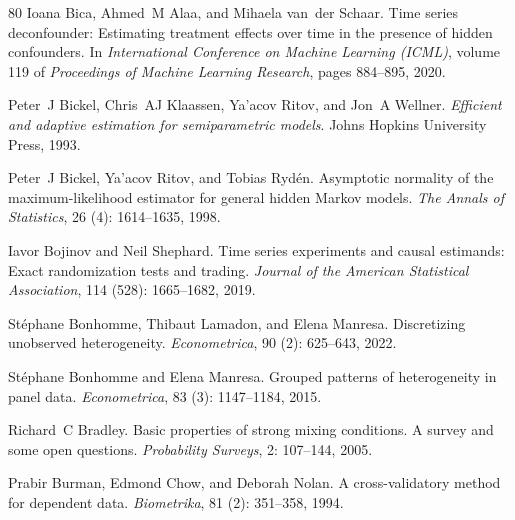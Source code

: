 \begin{thebibliography}{80}
Ioana Bica, Ahmed~M Alaa, and Mihaela van~der Schaar.
\newblock Time series deconfounder: Estimating treatment effects over time in the presence of hidden confounders.
\newblock In \emph{International Conference on Machine Learning (ICML)}, volume 119 of \emph{Proceedings of Machine Learning Research}, pages 884--895, 2020.

Peter~J Bickel, Chris~AJ Klaassen, Ya'acov Ritov, and Jon~A Wellner.
\newblock \emph{Efficient and adaptive estimation for semiparametric models}.
\newblock Johns Hopkins University Press, 1993.

Peter~J Bickel, Ya'acov Ritov, and Tobias Ryd{\'e}n.
\newblock Asymptotic normality of the maximum-likelihood estimator for general hidden {M}arkov models.
\newblock \emph{The Annals of Statistics}, 26 (4): 1614--1635, 1998.

Iavor Bojinov and Neil Shephard.
\newblock Time series experiments and causal estimands: Exact randomization tests and trading.
\newblock \emph{Journal of the American Statistical Association}, 114 (528): 1665--1682, 2019.

St{\'e}phane Bonhomme, Thibaut Lamadon, and Elena Manresa.
\newblock Discretizing unobserved heterogeneity.
\newblock \emph{Econometrica}, 90 (2): 625--643, 2022.

St{\'e}phane Bonhomme and Elena Manresa.
\newblock Grouped patterns of heterogeneity in panel data.
\newblock \emph{Econometrica}, 83 (3): 1147--1184, 2015.

Richard~C Bradley.
\newblock Basic properties of strong mixing conditions. {A} survey and some open questions.
\newblock \emph{Probability Surveys}, 2: 107--144, 2005.

Prabir Burman, Edmond Chow, and Deborah Nolan.
\newblock A cross-validatory method for dependent data.
\newblock \emph{Biometrika}, 81 (2): 351--358, 1994.


\end{thebibliography}
